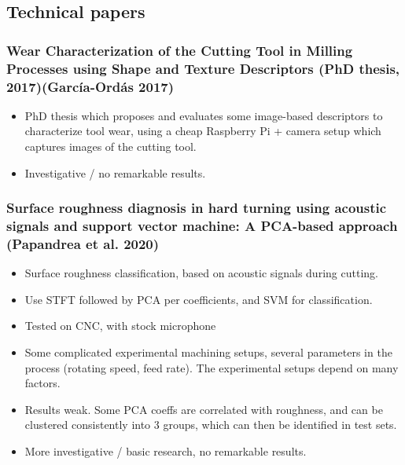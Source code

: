 \documentclass[
  letterpaper,
  DIV=11,
  numbers=noendperiod]{scrartcl}
\providecommand{\tightlist}{%
  \setlength{\itemsep}{0pt}\setlength{\parskip}{0pt}}\usepackage{longtable,booktabs,array}
\begin{document}
\hypertarget{technical-papers}{%
\subsection{Technical papers}\label{technical-papers}}

\hypertarget{wear-characterization-of-the-cutting-tool-in-milling-processes-using-shape-and-texture-descriptors-phd-thesis-2017ordas2017_wearcharactphd}{%
\subsubsection{Wear Characterization of the Cutting Tool in Milling
Processes using Shape and Texture Descriptors (PhD thesis,
2017)(García-Ordás
2017)}\label{wear-characterization-of-the-cutting-tool-in-milling-processes-using-shape-and-texture-descriptors-phd-thesis-2017ordas2017_wearcharactphd}}

\begin{itemize}
\item
  PhD thesis which proposes and evaluates some image-based descriptors
  to characterize tool wear, using a cheap Raspberry Pi + camera setup
  which captures images of the cutting tool.
\item
  Investigative / no remarkable results.
\end{itemize}

\hypertarget{surface-roughness-diagnosis-in-hard-turning-using-acoustic-signals-and-support-vector-machine-a-pca-based-approach-papandrea2020}{%
\subsubsection{Surface roughness diagnosis in hard turning using
acoustic signals and support vector machine: A PCA-based approach
(Papandrea et al.
2020)}\label{surface-roughness-diagnosis-in-hard-turning-using-acoustic-signals-and-support-vector-machine-a-pca-based-approach-papandrea2020}}

\begin{itemize}
\tightlist
\item
  Surface roughness classification, based on acoustic signals during
  cutting.
\item
  Use STFT followed by PCA per coefficients, and SVM for classification.
\item
  Tested on CNC, with stock microphone
\item
  Some complicated experimental machining setups, several parameters in
  the process (rotating speed, feed rate). The experimental setups
  depend on many factors.
\item
  Results weak. Some PCA coeffs are correlated with roughness, and can
  be clustered consistently into 3 groups, which can then be identified
  in test sets.
\item
  More investigative / basic research, no remarkable results.
\end{itemize}
\end{document}
